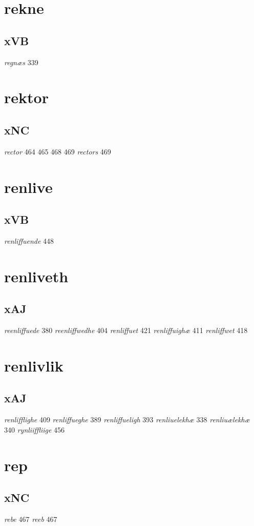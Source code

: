 \documentclass[a4paper,twocolumn]{article}
\begin{document}
\section{rekne}
\label{sec:org45055b5}
\subsection{xVB}
\label{sec:orgde02510}
\emph{regnæs} 339 
\section{rektor}
\label{sec:org8c38fa7}
\subsection{xNC}
\label{sec:org820448d}
\emph{rector} 464 465 468 469 \emph{rectors} 469 
\section{renlive}
\label{sec:org88579c2}
\subsection{xVB}
\label{sec:org6f2bd62}
\emph{renliffuende} 448 
\section{renliveth}
\label{sec:org7649387}
\subsection{xAJ}
\label{sec:orgbae9242}
\emph{reenliffuede} 380 \emph{reenliffwedhe} 404 \emph{renliffuet} 421 \emph{renliffuighæ} 411 \emph{renliffwet} 418 
\section{renlivlik}
\label{sec:org249c3ba}
\subsection{xAJ}
\label{sec:org69a8f88}
\emph{renlifflighe} 409 \emph{renliffueghe} 389 \emph{renliffueligh} 393 \emph{renliuelekhæ} 338 \emph{renliuælekhæ} 340 \emph{rynliiffliige} 456 
\section{rep}
\label{sec:orgeb9cace}
\subsection{xNC}
\label{sec:org4689d5f}
\emph{rebe} 467 \emph{reeb} 467 
\end{document}

